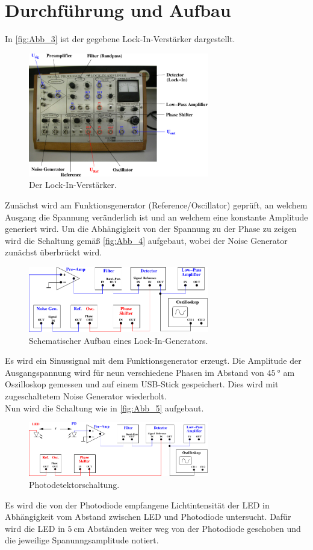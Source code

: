 \section{Durchführung und Aufbau}
\label{sec:Durchführung}

In \autoref{fig:Abb_3} ist der gegebene Lock-In-Verstärker dargestellt.
\begin{figure}[H]
    \centering
    \includegraphics[width=0.7\textwidth]{build/Abb_3.pdf}
    \caption {Der Lock-In-Verstärker\cite{V303}.}
    \label{fig:Abb_3}
\end{figure}
Zunächst wird am Funktionsgenerator (Reference/Oscillator) geprüft, an welchem Ausgang die Spannung veränderlich ist und an welchem eine konstante Amplitude generiert wird.
Um die Abhängigkeit von der Spannung zu der Phase zu zeigen wird die Schaltung gemäß \autoref{fig:Abb_4} aufgebaut, wobei der Noise Generator zunächst überbrückt wird.
\begin{figure}[H]
    \centering
    \includegraphics[width=0.7\textwidth]{build/Abb_4.pdf}
    \caption {Schematischer Aufbau eines Lock-In-Generators\cite{V303}.}
    \label{fig:Abb_4}
\end{figure}
Es wird ein Sinussignal mit dem Funktionsgenerator erzeugt.
Die Amplitude der Ausgangspannung wird für neun verschiedene Phasen im Abstand von $\qty{45}{\degree}$ am Oszilloskop gemessen und auf einem USB-Stick gespeichert.
Dies wird mit zugeschaltetem Noise Generator wiederholt.\\
Nun wird die Schaltung wie in \autoref{fig:Abb_5} aufgebaut.
\begin{figure}[H]
    \centering
    \includegraphics[width=0.7\textwidth]{build/Abb_5.pdf}
    \caption {Photodetektorschaltung\cite{V303}.}
    \label{fig:Abb_5}
\end{figure}
Es wird die von der Photodiode empfangene Lichtintensität der LED in Abhängigkeit vom Abstand zwischen LED und Photodiode untersucht.
Dafür wird die LED in $\qty{5}{\centi\meter}$ Abständen weiter weg von der Photodiode geschoben und die jeweilige Spanunngsamplitude notiert.

